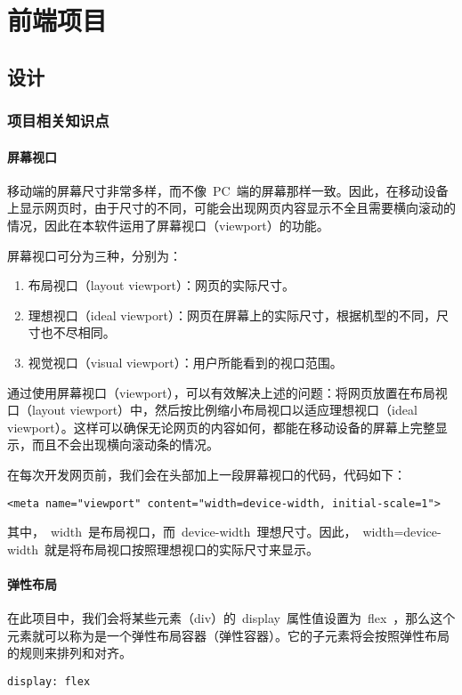 \chapter{前端项目}

\section{设计}
\subsection{项目相关知识点}
\subsubsection{屏幕视口}
移动端的屏幕尺寸非常多样，而不像~PC~端的屏幕那样一致。因此，在移动设备上显示网页时，由于尺寸的不同，可能会出现网页内容显示不全且需要横向滚动的情况，因此在本软件运用了屏幕视口（viewport）的功能。

屏幕视口可分为三种，分别为：
\begin{enumerate}
    \item{布局视口（layout viewport）}：网页的实际尺寸。
    \item {理想视口（ideal viewport）}：网页在屏幕上的实际尺寸，根据机型的不同，尺寸也不尽相同。
    \item {视觉视口（visual viewport）}：用户所能看到的视口范围。
\end{enumerate}

通过使用屏幕视口（viewport），可以有效解决上述的问题：将网页放置在布局视口（layout viewport）中，然后按比例缩小布局视口以适应理想视口（ideal viewport）。这样可以确保无论网页的内容如何，都能在移动设备的屏幕上完整显示，而且不会出现横向滚动条的情况。

在每次开发网页前，我们会在头部加上一段屏幕视口的代码，代码如下：
\begin{lstlisting}[basicstyle=\footnotesize]
<meta name="viewport" content="width=device-width, initial-scale=1">
\end{lstlisting}
其中，~width~是布局视口，而~device-width~理想尺寸。因此，~width=device-width~就是将布局视口按照理想视口的实际尺寸来显示。

\subsubsection{弹性布局}
在此项目中，我们会将某些元素（div）的~display~属性值设置为~flex~，那么这个元素就可以称为是一个弹性布局容器（弹性容器）。它的子元素将会按照弹性布局的规则来排列和对齐。
\begin{lstlisting}[basicstyle=\footnotesize]
display: flex
\end{lstlisting}

